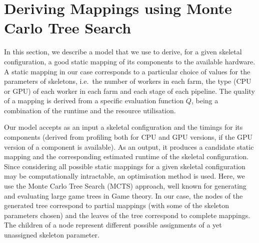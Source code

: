 \documentclass[smallextended]{svjour3}
\begin{document}



\section{Deriving Mappings using Monte Carlo Tree Search}
\noindent
In this section, we describe a model that we use to derive, for a
given skeletal configuration, a good  static mapping of its components to
the available hardware. A static mapping in our case corresponds to a
particular choice of values for the parameters of skeletons, i.e.\ the number of workers in
each farm, the type (CPU or GPU) of each worker in each farm and each stage of each pipeline. 
The quality of a mapping is derived from a specific evaluation function $Q$, being a combination of the runtime and the resource utilisation. 

Our model accepts as an input a skeletal configuration and
the timings for its components (derived from profiling both for CPU and
GPU versions, if the GPU version of a component is available). As an
output, it produces a candidate static mapping  and the corresponding estimated runtime of the skeletal
configuration. Since considering all possible static mappings for a given
skeletal configuration may be computationally intractable, an optimisation method is used. Here, we use the Monte Carlo Tree Search (MCTS) approach, well known for generating and
evaluating large game trees in Game theory. In our case,   the nodes of the
generated tree correspond to partial mappings (with some of the
skeleton parameters chosen) and the leaves of the tree correspond to
complete mappings. The children of a node represent different possible
assignments of a yet unassigned skeleton parameter.
\end{document}
